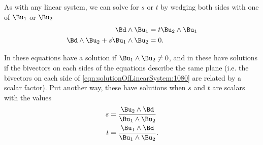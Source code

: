 As with any linear system, we can
solve for \( s \) or \( t \) by
wedging both sides with one of \( \Bu_1 \) or \( \Bu_2 \)
\begin{equation}\label{eqn:solutionOfLinearSystem:1080}
\begin{aligned}
\Bd \wedge \Bu_1 &= t \Bu_2 \wedge \Bu_1 \\
\Bd \wedge \Bu_2 + s \Bu_1 \wedge \Bu_2 &= 0.
\end{aligned}
\end{equation}

In  these equations have a solution if \( \Bu_1 \wedge \Bu_2 \ne 0 \), and in  these have solutions if the bivectors on each sides of the equations describe the same plane (i.e. the bivectors on each side of \cref{eqn:solutionOfLinearSystem:1080} are related by a scalar factor).
Put another way, these have solutions when \( s \) and \( t \) are scalars with the values
\begin{equation}\label{eqn:solutionOfLinearSystem:1100}
\begin{aligned}
s &= \frac{\Bu_2 \wedge \Bd}{\Bu_1 \wedge \Bu_2} \\
t &= \frac{\Bu_1 \wedge \Bd}{\Bu_1 \wedge \Bu_2}.
\end{aligned}
\end{equation}

